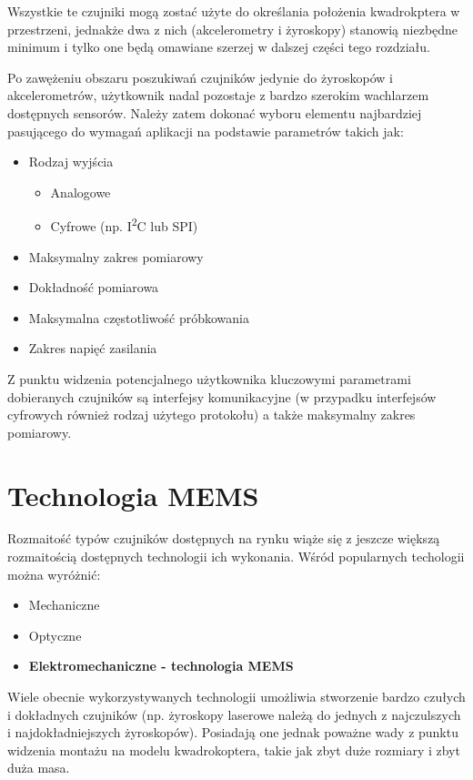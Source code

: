 Wszystkie te czujniki mogą zostać użyte do określania położenia kwadrokptera w przestrzeni, jednakże dwa z nich (akcelerometry i żyroskopy) stanowią niezbędne minimum i tylko one będą omawiane szerzej w dalszej części tego rozdziału.

Po zawężeniu obszaru poszukiwań czujników jedynie do żyroskopów i akcelerometrów, użytkownik nadal pozostaje z bardzo szerokim wachlarzem dostępnych sensorów. Należy zatem dokonać wyboru elementu najbardziej pasującego do wymagań aplikacji na podstawie parametrów takich jak:

\begin{itemize}
	\item Rodzaj wyjścia
		\begin{itemize}
			\item Analogowe
			\item Cyfrowe (np. I\textsuperscript{2}C lub SPI)
		\end{itemize}
	\item Maksymalny zakres pomiarowy
	\item Dokładność pomiarowa
	\item Maksymalna częstotliwość próbkowania
	\item Zakres napięć zasilania
\end{itemize}

Z punktu widzenia potencjalnego użytkownika kluczowymi parametrami dobieranych czujników są interfejsy komunikacyjne (w przypadku interfejsów cyfrowych również rodzaj użytego protokołu) a także maksymalny zakres pomiarowy.

\section{Technologia MEMS}

Rozmaitość typów czujników dostępnych na rynku wiąże się z jeszcze większą rozmaitością dostępnych technologii ich wykonania. Wśród popularnych techologii można wyróżnić:

\begin{itemize}
	\item Mechaniczne
	\item Optyczne
	\item \textbf{Elektromechaniczne - technologia MEMS}
\end{itemize}

Wiele obecnie wykorzystywanych technologii umożliwia stworzenie bardzo czułych i dokładnych czujników (np. żyroskopy laserowe należą do jednych z najczulszych i najdokładniejszych żyroskopów). Posiadają one jednak poważne wady z punktu widzenia montażu na modelu kwadrokoptera, takie jak zbyt duże rozmiary i zbyt duża masa. 

